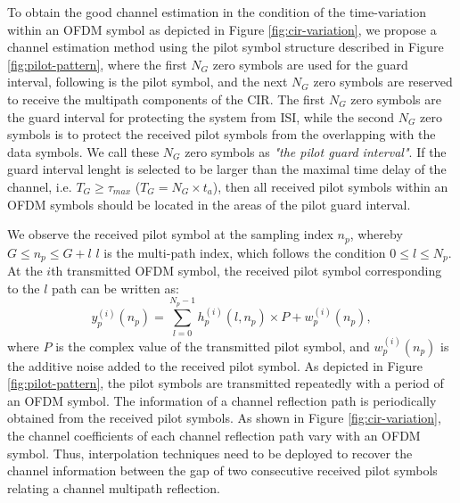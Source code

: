 \documentclass[12pt,journal,draftclsnofoot,onecolumn]{IEEEtran}
\begin{document}
To obtain the good channel estimation in the condition of the time-variation within an OFDM symbol as depicted in Figure \ref{fig:cir-variation}, we propose a channel estimation method using the pilot symbol structure described in Figure \ref{fig:pilot-pattern}, where the first $N_G$ zero symbols are used for the guard interval, following is the pilot symbol, and the next $N_G$ zero symbols are reserved to receive the multipath components of the CIR. The  first $N_G$ zero symbols are the guard interval for protecting the system from ISI, while the second  $N_G$ zero symbols is to protect the received pilot symbols from the overlapping with the data symbols. We call these  $N_G$ zero symbols as {\it{"the pilot guard interval"}}. If the guard interval lenght is selected to be larger than the maximal time delay of the channel, i.e. $T_{G} \geqslant \tau_{max}$ (${T_{G}=N_G \times t_a }$), then all received pilot symbols within an OFDM symbols should be located in the areas of the pilot guard interval.


We observe the received pilot symbol at the sampling index $n_p$, whereby $G\leq n_p \leq G + l$ $l$ is the multi-path index, which follows the condition $0\leq l \leq N_p $.  At the $i$th transmitted OFDM symbol, the received pilot symbol corresponding to the $l$ path can be written as:
	\begin{equation}\label{eq:received-pilot-symbol}
	y^{(i)}_{p}(n_p) = \sum_{l = 0}^{N_p - 1} h^{(i)}_{p}(l,n_p) \times P  + w^{(i)}_{p}(n_p),                 
	\end{equation}
where $P$ is the complex value of the transmitted pilot symbol, and $w^{(i)}_{p}(n_p)$ is the additive noise added to the received pilot symbol. As depicted in Figure \ref{fig:pilot-pattern}, the pilot symbols are transmitted repeatedly with a period of an OFDM symbol. The information of a channel reflection path is periodically obtained from the received pilot symbols. As shown in Figure  \ref{fig:cir-variation}, the channel coefficients  of each channel reflection path vary with an OFDM symbol. Thus, interpolation techniques need to be deployed to recover the channel information between the gap of two consecutive received pilot symbols relating a channel multipath reflection. 
\end{document}
